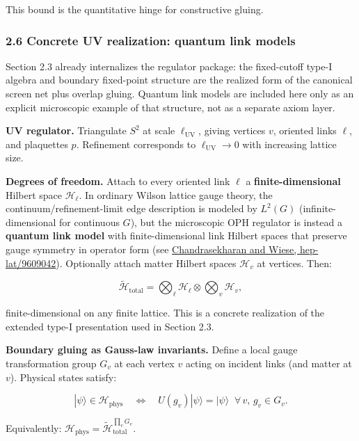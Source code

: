 This bound is the quantitative hinge for constructive gluing.

\subsubsection{2.6 Concrete UV realization: quantum link models}\label{26-concrete-uv-realization-quantum-link-models}

Section 2.3 already internalizes the regulator package: the fixed-cutoff type-I algebra and boundary fixed-point structure are the realized form of the canonical screen net plus overlap gluing. Quantum link models are included here only as an explicit microscopic example of that structure, not as a separate axiom layer.

\textbf{UV regulator.} Triangulate \(S^2\) at scale \(\ell_{\mathrm{UV}}\), giving vertices \(v\), oriented links \(\ell\), and plaquettes \(p\). Refinement corresponds to \(\ell_{\mathrm{UV}} \to 0\) with increasing lattice size.

\textbf{Degrees of freedom.} Attach to every oriented link \(\ell\) a \textbf{finite-dimensional} Hilbert space \(\mathcal{H}_\ell\). In ordinary Wilson lattice gauge theory, the continuum/refinement-limit edge description is modeled by \(L^2(G)\) (infinite-dimensional for continuous \(G\)), but the microscopic OPH regulator is instead a \textbf{quantum link model} with finite-dimensional link Hilbert spaces that preserve gauge symmetry in operator form (see \href{https://arxiv.org/abs/hep-lat/9609042}{Chandrasekharan and Wiese, hep-lat/9609042}). Optionally attach matter Hilbert spaces \(\mathcal{H}_v\) at vertices. Then:

\[
\tilde{\mathcal{H}}_{\mathrm{total}} = \bigotimes_\ell \mathcal{H}_\ell \otimes \bigotimes_v \mathcal{H}_v,
\]

finite-dimensional on any finite lattice. This is a concrete realization of the extended type-I presentation used in Section 2.3.

\textbf{Boundary gluing as Gauss-law invariants.} Define a local gauge transformation group \(G_v\) at each vertex \(v\) acting on incident links (and matter at \(v\)). Physical states satisfy:

\[
|\psi\rangle \in \mathcal{H}_{\mathrm{phys}} \quad\Longleftrightarrow\quad U(g_v)|\psi\rangle = |\psi\rangle \;\;\forall\, v,\, g_v \in G_v.
\]

Equivalently: \(\mathcal{H}_{\mathrm{phys}} = \tilde{\mathcal{H}}_{\mathrm{total}}^{\prod_v G_v}\).

